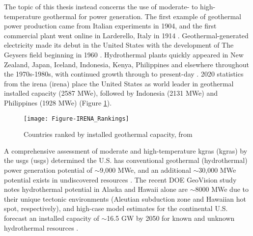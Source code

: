 The topic of this thesis instead concerns the use of moderate- to high-temperature geothermal for power generation. The first example of geothermal power production came from Italian experiments in 1904, and the first commercial plant went online in Larderello, Italy in 1914 \citep[~p. 251]{dipippo_geothermal_2012}. Geothermal-generated electricity made its debut in the United States with the development of The Geysers field beginning in 1960 \citep{tester_future_2006}. Hydrothermal plants quickly appeared in New Zealand, Japan, Iceland, Indonesia, Kenya, Philippines and elsewhere throughout the 1970s-1980s, with continued growth through to present-day \citep{lund_characteristics_2007}. 2020 statistics from the \acrlong{irena} (\acrshort{irena}) place the United States as world leader in geothermal installed capacity (2587 MWe), followed by Indonesia (2131 MWe) and Philippines (1928 MWe) \citep{irena_country_2021} (Figure \ref{fig:irena-rank}). 

\begin{figure}[htbp]
\centering
\texttt{[image: Figure-IRENA\_Rankings]}
\caption[Country rankings, installed geothermal capacity ]{Countries ranked by installed geothermal capacity, from \protect\citep{irena_country_2021}}
\label{fig:irena-rank}
\end{figure}

A comprehensive assessment of moderate and high-temperature \acrlong{kgra}s (\acrshort{kgra}s) by the \acrlong{usgs} (\acrshort{usgs}) determined the U.S. has conventional geothermal (hydrothermal) power generation potential of $\sim$9,000 MWe, and an additional $\sim$30,000 MWe potential exists in undiscovered resources \citep{williams_assessment_2008}. The recent DOE GeoVision study notes hydrothermal potential in Alaska and Hawaii alone are $\sim$8000 MWe due to their unique tectonic environments (Aleutian subduction zone and Hawaiian hot spot, respectively), and high-case model estimates for the continental U.S. forecast an installed capacity of $\sim$16.5 GW by 2050 for known and unknown hydrothermal resources \citep{augustine_geovision_2019,hamm_overview_2019}.

